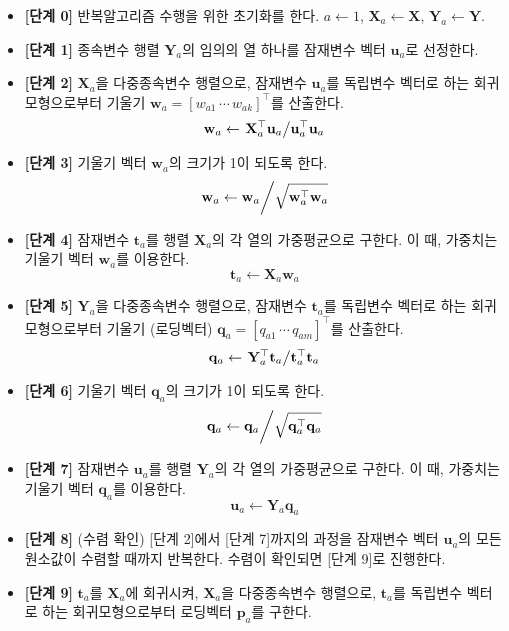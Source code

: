\documentclass[
]{book}
\providecommand{\tightlist}{%
  \setlength{\itemsep}{0pt}\setlength{\parskip}{0pt}}
\begin{document}
\begin{itemize}
\tightlist
\item
  \textbf{{[}단계 0{]}} 반복알고리즘 수행을 위한 초기화를 한다. \(a \leftarrow 1\), \(\mathbf{X}_a \leftarrow \mathbf{X}\), \(\mathbf{Y}_a \leftarrow \mathbf{Y}\).
\item
  \textbf{{[}단계 1{]}} 종속변수 행렬 \(\mathbf{Y}_a\)의 임의의 열 하나를 잠재변수 벡터 \(\mathbf{u}_a\)로 선정한다.
\item
  \textbf{{[}단계 2{]}} \(\mathbf{X}_a\)을 다중종속변수 행렬으로, 잠재변수 \(\mathbf{u}_a\)를 독립변수 벡터로 하는 회귀모형으로부터 기울기 \(\mathbf{w}_a = [w_{a1} \, \cdots \, w_{ak}]^\top\)를 산출한다.
  \[\mathbf{w}_a \leftarrow \left. \mathbf{X}_a^\top \mathbf{u}_a \middle/ \mathbf{u}_a^\top \mathbf{u}_a \right.  \]
\item
  \textbf{{[}단계 3{]}} 기울기 벡터 \(\mathbf{w}_a\)의 크기가 1이 되도록 한다.
  \[\left. \mathbf{w}_a \leftarrow \mathbf{w}_a \middle/ \sqrt{\mathbf{w}_a^\top \mathbf{w}_a} \right.\]
\item
  \textbf{{[}단계 4{]}} 잠재변수 \(\mathbf{t}_a\)를 행렬 \(\mathbf{X}_a\)의 각 열의 가중평균으로 구한다. 이 때, 가중치는 기울기 벡터 \(\mathbf{w}_a\)를 이용한다.
  \[\mathbf{t}_a \leftarrow \mathbf{X}_a \mathbf{w}_a\]
\item
  \textbf{{[}단계 5{]}} \(\mathbf{Y}_a\)을 다중종속변수 행렬으로, 잠재변수 \(\mathbf{t}_a\)를 독립변수 벡터로 하는 회귀모형으로부터 기울기 (로딩벡터) \(\mathbf{q}_a = [q_{a1} \, \cdots \, q_{am}]^\top\)를 산출한다.
  \[\mathbf{q}_a \leftarrow \left. \mathbf{Y}_a^\top \mathbf{t}_a \middle/ \mathbf{t}_a^\top \mathbf{t}_a \right.  \]
\item
  \textbf{{[}단계 6{]}} 기울기 벡터 \(\mathbf{q}_a\)의 크기가 1이 되도록 한다.
  \[\left. \mathbf{q}_a \leftarrow \mathbf{q}_a \middle/ \sqrt{\mathbf{q}_a^\top \mathbf{q}_a} \right.\]
\item
  \textbf{{[}단계 7{]}} 잠재변수 \(\mathbf{u}_a\)를 행렬 \(\mathbf{Y}_a\)의 각 열의 가중평균으로 구한다. 이 때, 가중치는 기울기 벡터 \(\mathbf{q}_a\)를 이용한다.
  \[\mathbf{u}_a \leftarrow \mathbf{Y}_a \mathbf{q}_a\]
\item
  \textbf{{[}단계 8{]}} (수렴 확인) {[}단계 2{]}에서 {[}단계 7{]}까지의 과정을 잠재변수 벡터 \(\mathbf{u}_a\)의 모든 원소값이 수렴할 때까지 반복한다. 수렴이 확인되면 {[}단계 9{]}로 진행한다.
\item
  \textbf{{[}단계 9{]}} \(\mathbf{t}_a\)를 \(\mathbf{X}_a\)에 회귀시켜, \(\mathbf{X}_a\)을 다중종속변수 행렬으로, \(\mathbf{t}_a\)를 독립변수 벡터로 하는 회귀모형으로부터 로딩벡터 \(\mathbf{p}_a\)를 구한다.

\end{itemize}
\end{document}
